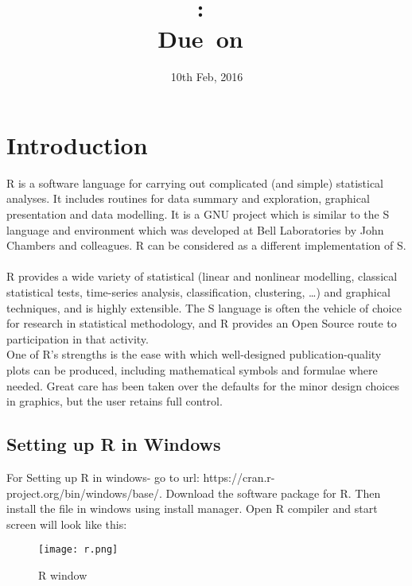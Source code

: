\documentclass{article}
\title{
\vspace{2in}
\textmd{\textbf{\hmwkClass:\ \hmwkTitle}}\\
\normalsize\vspace{0.1in}\small{Due\ on\ \hmwkDueDate}\\
\vspace{0.1in}\large{\textit{\hmwkClassInstructor}}
\vspace{3in}
}
\author{\textbf{\hmwkAuthorName}}
\date{10th Feb, 2016} %
\begin{document}
\maketitle



\newpage
\tableofcontents
\newpage


\section{Introduction}
R is a software language for carrying out complicated (and simple) statistical analyses. It includes
routines for data summary and exploration, graphical presentation and data modelling. It is a GNU project which is similar to the S language and environment which was developed at Bell Laboratories  by John Chambers and colleagues. R can be considered as a different implementation of S.\\
\\
R provides a wide variety of statistical (linear and nonlinear modelling, classical statistical tests, time-series analysis, classification, clustering, …) and graphical techniques, and is highly extensible. The S language is often the vehicle of choice for research in statistical methodology, and R provides an Open Source route to participation in that activity.\\

One of R’s strengths is the ease with which well-designed publication-quality plots can be produced, including mathematical symbols and formulae where needed. Great care has been taken over the defaults for the minor design choices in graphics, but the user retains full control.

\subsection{Setting up R in Windows}
For Setting up R in windows- go to url: https://cran.r-project.org/bin/windows/base/. Download the software package for R. Then install the file in windows using install manager. Open R compiler and start screen will look like this:\\
\begin{figure}[h!]
\texttt{[image: r.png]}
  \centering
  \caption{R window}
  \label{fig:barchart1}
\end{figure}
\end{document}
